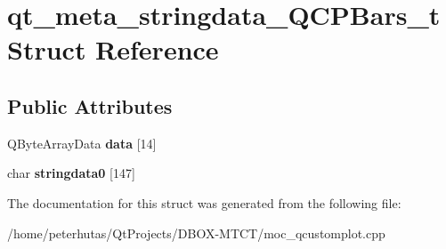 \hypertarget{structqt__meta__stringdata___q_c_p_bars__t}{}\section{qt\+\_\+meta\+\_\+stringdata\+\_\+\+Q\+C\+P\+Bars\+\_\+t Struct Reference}
\label{structqt__meta__stringdata___q_c_p_bars__t}
\subsection*{Public Attributes}
\begin{DoxyCompactItemize}
\item 
\mbox{\label{structqt__meta__stringdata___q_c_p_bars__t_a40d7e47e2037dd5bb7c67e6397d92852}} 
Q\+Byte\+Array\+Data {\bfseries data} \mbox{[}14\mbox{]}
\item 
\mbox{\label{structqt__meta__stringdata___q_c_p_bars__t_ab1c5ceea0b404e0edfc8690c1a945309}} 
char {\bfseries stringdata0} \mbox{[}147\mbox{]}
\end{DoxyCompactItemize}


The documentation for this struct was generated from the following file\+:\begin{DoxyCompactItemize}
\item 
/home/peterhutas/\+Qt\+Projects/\+D\+B\+O\+X-\/\+M\+T\+C\+T/moc\+\_\+qcustomplot.\+cpp\end{DoxyCompactItemize}
